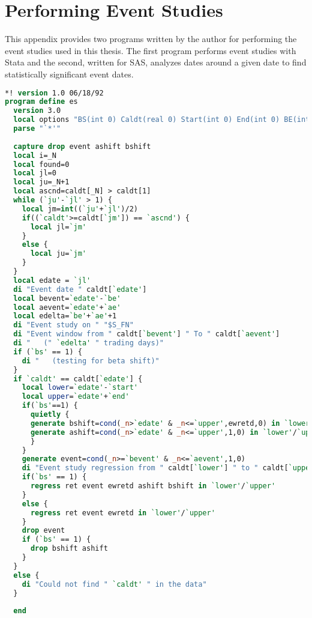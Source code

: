 
\appendix
\chapter{Performing Event Studies}

This appendix provides two programs written by the author for performing the event studies used in this thesis.  The first program performs event studies with Stata and the second, written for SAS, analyzes dates around a given date to find statistically significant event dates.

\begin{singlespace}
\begin{lstlisting}[language=stata,caption=Event studies with Stata]
*! version 1.0 06/18/92
program define es
  version 3.0
  local options "BS(int 0) Caldt(real 0) Start(int 0) End(int 0) BE(int 0) AE(int 0)"
  parse "`*'"
  
  capture drop event ashift bshift
  local i=_N
  local found=0
  local jl=0
  local ju=_N+1
  local ascnd=caldt[_N] > caldt[1]
  while (`ju'-`jl' > 1) {
    local jm=int((`ju'+`jl')/2)
    if((`caldt'>=caldt[`jm']) == `ascnd') {
      local jl=`jm'
    }
    else {
      local ju=`jm'
    }
  }
  local edate = `jl'
  di "Event date " caldt[`edate']
  local bevent=`edate'-`be'
  local aevent=`edate'+`ae'
  local edelta=`be'+`ae'+1
  di "Event study on " "$S_FN"
  di "Event window from " caldt[`bevent'] " To " caldt[`aevent']
  di "   (" `edelta' " trading days)"
  if (`bs' == 1) {
    di "   (testing for beta shift)"
  }
  if `caldt' == caldt[`edate'] {
    local lower=`edate'-`start'
    local upper=`edate'+`end'
    if(`bs'==1) {
      quietly {
      generate bshift=cond(_n>`edate' & _n<=`upper',ewretd,0) in `lower'/`upper'
      generate ashift=cond(_n>`edate' & _n<=`upper',1,0) in `lower'/`upper'
      }
    }
    generate event=cond(_n>=`bevent' & _n<=`aevent',1,0)
    di "Event study regression from " caldt[`lower'] " to " caldt[`upper']
    if(`bs' == 1) {
      regress ret event ewretd ashift bshift in `lower'/`upper'
    }
    else {
      regress ret event ewretd in `lower'/`upper'
    }
    drop event
    if (`bs' == 1) {
      drop bshift ashift
    }
  }
  else {
    di "Could not find " `caldt' " in the data"
  }
     
  end
\end{lstlisting}
\end{singlespace}

